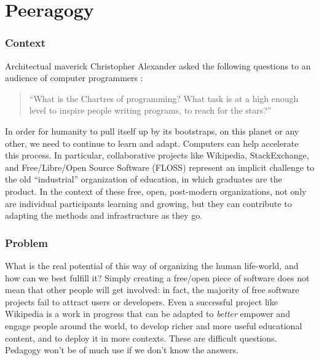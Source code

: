 \begingroup
\color{OliveGreen}

\section{Peeragogy}\label{sec:Peeragogy_Project}

\subsubsection*{Context}  Architectual maverick Christopher Alexander asked the following questions to an audience of computer programmers \cite{alexander1999origins}: 
\begin{quote}
``What is the Chartres of programming? What task is at a high enough level to inspire people writing programs, to reach for the stars?''
\end{quote}
In order for humanity to pull itself up by its bootstraps, on this planet or any other, we need to continue to learn and adapt.  Computers can help accelerate this process.  In particular, collaborative projects like Wikipedia, StackExchange, and Free/Libre/Open Source Software (FLOSS) represent an implicit challenge to the old ``industrial'' organization of education, in which graduates are the product.  In the context of these free, open, post-modern organizations, not only are individual participants learning and growing, but they can contribute to adapting the methods and infrastructure as they go.

\subsubsection*{Problem} What is the real potential of this way of organizing the human life-world, and how can we best fulfill it?  Simply creating a free/open piece of software does not mean that other people will get involved: in fact, the majority of free software projects fail to attract users or developers.  Even a successful project like Wikipedia is a work in progress that can be adapted to \emph{better} empower and engage people around the world, to develop richer and more useful educational content, and to deploy it in more contexts.  These are difficult questions.  Pedagogy won't be of much use if we don't know the answers.

